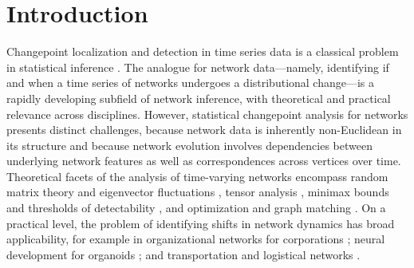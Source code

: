 \documentclass[12pt]{article}
\theoremstyle{definition}
\begin{document}
\section{Introduction}



Changepoint localization and detection in time series data is a classical problem in statistical inference \cite{shumway2000time,box2015time,kedem2005regression, verzelen2023optimal, padilla2021optimal}. The analogue for network data---namely, identifying if and when a time series of networks undergoes a distributional change---is a rapidly developing subfield of network inference, with theoretical and practical relevance across disciplines. However, statistical changepoint analysis for networks presents distinct challenges, because network data is inherently non-Euclidean in its structure and because network evolution involves dependencies between underlying network features as well as correspondences across vertices over time.  Theoretical facets of the analysis of time-varying networks encompass random matrix theory and eigenvector fluctuations \cite{cape2019signal,agterberg2022entrywise,tang2025eigenvector}, tensor analysis 
\cite{macdonald2022latent,pensky2025signed,chen2022analysis}, minimax bounds and thresholds of detectability \cite{cai2021optimal,zhang2018tensor,lei2024computational}, and optimization and graph matching \cite{fishkind2019seeded,arroyo2021graph,saad2021graph, BergmannHerzogJasa:2024}. On a practical level, the problem of identifying shifts in network dynamics has broad applicability, for example in organizational networks for corporations \cite{zuzul2021dynamic}; neural development for organoids \cite{chen_worm}; and transportation and logistical networks \cite{agterberg2022joint}. 
\end{document}
